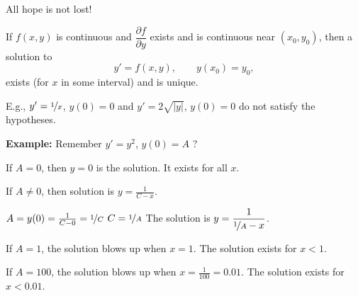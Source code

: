 \documentclass[10pt,aspectratio=169]{beamer}
\begin{document}
\begin{frame}
All hope is not lost!

\pause

\begin{theorem}%
If $f(x,y)$ is continuous and $\dfrac{\partial f}{\partial y}$ exists and is
continuous near $(x_0,y_0)$, then a solution to
\begin{equation*}
y' = f(x,y), \qquad y(x_0) = y_0,
\end{equation*}
exists (for $x$ in some interval) and is unique.
\end{theorem}

\pause

E.g., \quad $y' = \nicefrac{1}{x}$, $y(0) = 0$
\quad and \quad $y' = 2 \sqrt{\lvert y \rvert}$, $y(0) = 0$ \quad
do not satisfy the hypotheses.

\medskip
\pause

\textbf{Example:}
Remember
\quad
$y' = y^2$, \quad $y(0) = A$ \quad ?

\medskip
\pause

If $A=0$, then $y=0$ is the solution.  It exists for all $x$.

\medskip
\pause

If $A \neq 0$, then solution is $y = \frac{1}{C-x}$.

\medskip
\pause

$A = y(0) = \frac{1}{C-0} = \nicefrac{1}{C}$
\pause
\wthus
$C=\nicefrac{1}{A}$
\pause
\wthus
The solution is
$\displaystyle
y = \frac{1}{\nicefrac{1}{A} - x}$.

\medskip
\pause

If $A=1$, the solution blows up when $x=1$.
The solution exists for $x < 1$.

\medskip
\pause

If $A=100$, the solution blows up when $x=\frac{1}{100}=0.01$.
The solution exists for $x < 0.01$.
\end{frame}
\end{document}
